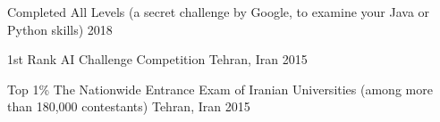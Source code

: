 

\begin{cvhonors}

  \cvhonor
    {Completed All Levels} %
    { (a secret challenge by Google, to examine your Java or Python skills)} %
    {} %
    {2018} %

  \cvhonor
    {1st Rank} %
    { AI Challenge Competition} %
    {Tehran, Iran} %
    {2015} %

  \cvhonor
    {Top 1\%} %
    {The Nationwide Entrance Exam of Iranian Universities (among more than 180,000 contestants)} %
    {Tehran, Iran} %
    {2015} %


\end{cvhonors}
